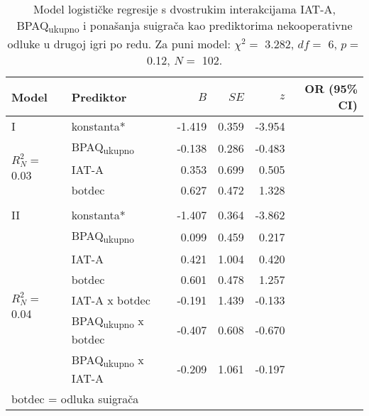 \documentclass[a4paper, 12pt]{report}
\begin{document}
\begin{table}
    \begin{center}
        \caption{\label{glmtotgam22} Model logističke regresije s dvostrukim interakcijama IAT-A,
            BPAQ\textsubscript{ukupno} i ponašanja suigrača kao prediktorima
            nekooperativne odluke u drugoj igri po redu. Za puni
            model: $\chi^2 =$
            3.282, $df =$ 6, $p =$ 0.12, $N =$ 102.}
        \hspace*{-0.5cm}\begin{tabular}{llrrrr}
        \toprule
        Model & Prediktor & $B$ & $SE$ & $z$ & OR (95\% CI)\\
        \midrule
        I & konstanta* & -1.419 & 0.359 & -3.954 &\\
        \multirow{3}{*}{$R^2_N =$ 0.03}
        &BPAQ\textsubscript{ukupno} & -0.138 & 0.286 & -0.483 &\\
        &IAT-A & 0.353 & 0.699 & 0.505 &\\
        &botdec & 0.627 & 0.472 & 1.328 & \\
        &&&&&\\ 
        II & konstanta* & -1.407 & 0.364 & -3.862 & \\
        \multirow{6}{*}{$R^2_N =$ 0.04}
        &BPAQ\textsubscript{ukupno} & 0.099 & 0.459 & 0.217 & \\
        &IAT-A & 0.421 & 1.004 & 0.420 &\\
        &botdec & 0.601 & 0.478 & 1.257  & \\
        &IAT-A x botdec & -0.191 & 1.439 & -0.133 & \\
        &BPAQ\textsubscript{ukupno} x botdec & -0.407 & 0.608 & -0.670 & \\
        &BPAQ\textsubscript{ukupno} x IAT-A & -0.209 & 1.061 & -0.197 & \\
        \bottomrule
        \multicolumn{5}{l}{
            \parbox{3cm}{\scriptsize \vspace{3pt} 
                botdec = odluka suigrača
        }}
    \end{tabular}
\end{center}
\end{table}
\end{document}
